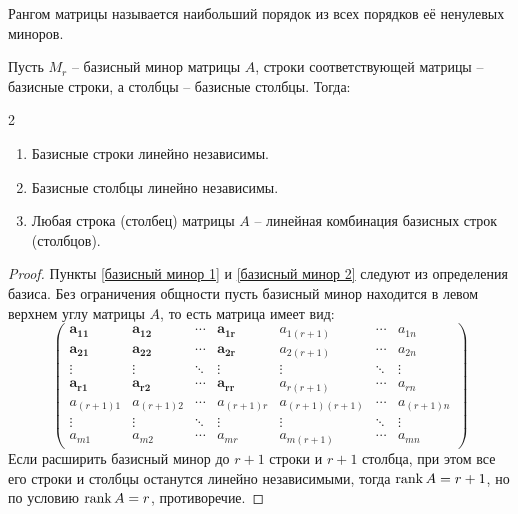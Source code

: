 \documentclass[12pt]{article}
\begin{document}
\begin{definition}
    Рангом матрицы называется наибольший порядок из всех порядков её ненулевых миноров.
\end{definition}
\begin{theorem}
    Пусть $M_r$ – базисный минор матрицы $A$, строки соответствующей матрицы – базисные строки, а столбцы – базисные столбцы. Тогда:
    \begin{multicols}{2}
        \begin{enumerate}
        \item \label{базисный минор 1} Базисные строки линейно независимы.
        \item \label{базисный минор 2} Базисные столбцы линейно независимы.
        \item Любая строка (столбец) матрицы $A$ – линейная комбинация базисных строк (столбцов).
    \end{enumerate}
    \end{multicols}
\end{theorem}
\begin{proof}
    Пункты \ref{базисный минор 1} и \ref{базисный минор 2} следуют из определения базиса. Без ограничения общности пусть базисный минор находится в левом верхнем углу матрицы $A$, то есть матрица имеет вид:
    $$\begin{pmatrix}
        \boldsymbol{a_{11}} & \boldsymbol{a_{12}} & \cdots & \boldsymbol{a_{1r}} & a_{1(r+1)} & \cdots & a_{1n}\\
        \boldsymbol{a_{21}} & \boldsymbol{a_{22}} & \cdots & \boldsymbol{a_{2r}} & a_{2(r+1)} & \cdots & a_{2n}\\
        \vdots & \vdots & \ddots & \vdots & \vdots & \ddots & \vdots\\
        \boldsymbol{a_{r1}} & \boldsymbol{a_{r2}} & \cdots & \boldsymbol{a_{rr}} & a_{r(r+1)} & \cdots & a_{rn}\\
        a_{(r+1)1} & a_{(r+1)2} & \cdots & a_{(r+1)r} & a_{(r+1)(r+1)} & \cdots & a_{(r+1)n}\\
        \vdots & \vdots & \ddots & \vdots & \vdots & \ddots & \vdots\\
        a_{m1} & a_{m2} & \cdots & a_{mr} & a_{m(r+1)} & \cdots & a_{mn}
    \end{pmatrix}$$
    Если расширить базисный минор до $r+1$ строки и $r+1$ столбца, при этом все его строки и столбцы останутся линейно независимыми, тогда $\operatorname{rank} A=r+1$, но по условию $\operatorname{rank} A=r$, противоречие.
\end{proof}
\end{document}
